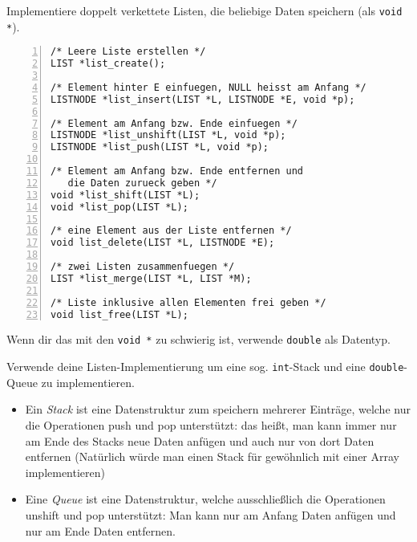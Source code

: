 \documentclass{uebungszettel}
\begin{document}
\begin{aufg}
Implementiere doppelt verkettete Listen, die beliebige Daten speichern (als \verb|void *|).

\begin{codelisting}
\begin{lstlisting}[numbers=left,numberstyle=\tiny,frame=tlrb]
/* Leere Liste erstellen */
LIST *list_create();

/* Element hinter E einfuegen, NULL heisst am Anfang */
LISTNODE *list_insert(LIST *L, LISTNODE *E, void *p);

/* Element am Anfang bzw. Ende einfuegen */
LISTNODE *list_unshift(LIST *L, void *p);
LISTNODE *list_push(LIST *L, void *p);

/* Element am Anfang bzw. Ende entfernen und 
   die Daten zurueck geben */
void *list_shift(LIST *L);
void *list_pop(LIST *L);

/* eine Element aus der Liste entfernen */
void list_delete(LIST *L, LISTNODE *E);

/* zwei Listen zusammenfuegen */
LIST *list_merge(LIST *L, LIST *M);

/* Liste inklusive allen Elementen frei geben */
void list_free(LIST *L);

\end{lstlisting}
\end{codelisting}

Wenn dir das mit den \verb|void *| zu schwierig ist, verwende \verb|double| als Datentyp.
\end{aufg}

\begin{aufg}
Verwende deine Listen-Implementierung um eine sog. \verb|int|-Stack und eine \verb|double|-Queue zu implementieren.

\begin{itemize}
\item Ein \emph{Stack} ist eine Datenstruktur zum speichern mehrerer Einträge, welche nur die Operationen push und pop unterstützt: das heißt, man kann immer nur am Ende des Stacks neue Daten anfügen und auch nur von dort Daten entfernen (Natürlich würde man einen Stack für gewöhnlich mit einer Array implementieren)
\item Eine \emph{Queue} ist eine Datenstruktur, welche ausschließlich die Operationen unshift und pop unterstützt: Man kann nur am Anfang Daten anfügen und nur am Ende Daten entfernen.
\end{itemize}
\end{aufg}
\end{document}
